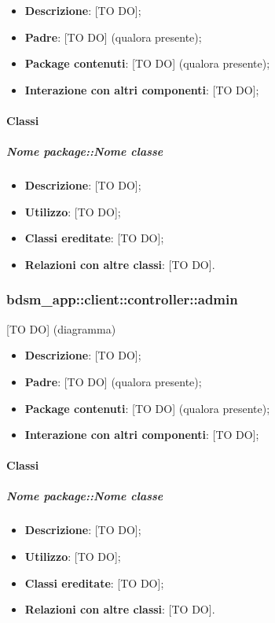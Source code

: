 	\begin{itemize}
		\item \textbf{Descrizione}: [TO DO];
		\item \textbf{Padre}: [TO DO] (qualora presente);
		\item \textbf{Package contenuti}: [TO DO] (qualora presente);
		\item \textbf{Interazione con altri componenti}: [TO DO];
	\end{itemize}

		\paragraph{Classi} %
			\subparagraph{Nome package::Nome classe} %
			\label{subp:subparagraph_name}
				\begin{itemize}
					\item \textbf{Descrizione}: [TO DO];
					\item \textbf{Utilizzo}: [TO DO];
					\item \textbf{Classi ereditate}: [TO DO];
					\item \textbf{Relazioni con altre classi}: [TO DO].
				\end{itemize}

	\subsubsection{bdsm\_app::client::controller::admin} %
	\label{ssub:bdsm_app_client_controller_admin}
	[TO DO] (diagramma) \newline \newline

	\begin{itemize}
		\item \textbf{Descrizione}: [TO DO];
		\item \textbf{Padre}: [TO DO] (qualora presente);
		\item \textbf{Package contenuti}: [TO DO] (qualora presente);
		\item \textbf{Interazione con altri componenti}: [TO DO];
	\end{itemize}

		\paragraph{Classi} %
			\subparagraph{Nome package::Nome classe} %
			\label{subp:subparagraph_name}
				\begin{itemize}
					\item \textbf{Descrizione}: [TO DO];
					\item \textbf{Utilizzo}: [TO DO];
					\item \textbf{Classi ereditate}: [TO DO];
					\item \textbf{Relazioni con altre classi}: [TO DO].
				\end{itemize}


